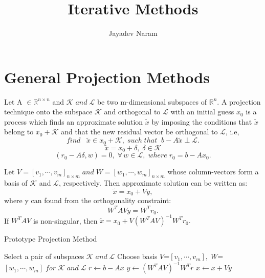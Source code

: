 \documentclass[10pt,a4paper]{article}
\author{Jayadev Naram}
\title{Iterative Methods}
\begin{document}
\maketitle 

\maketitle
 
\tableofcontents

\newpage

  
\newtheorem{theorem}{Theorem}
\newtheorem{corollary}{Corollary}[theorem]
\newtheorem{lemma}[theorem]{Lemma}
\newtheorem{mydef}{Definition}
\newtheorem*{remark}{Remark}
\newtheorem*{prop}{Proposition}

\section{General Projection Methods}

Let A $\in\mathbb{R}^{n\times n}$ and $\mathcal{K}\;and\;\mathcal{L}$ be two m-dimensional subspaces of $\mathbb{R}^n$. A projection technique onto the subspace $\mathcal{K}$ and orthogonal to $\mathcal{L}$ with an initial guess $x_0$ is a process which finds an approximate solution $\tilde{x}$ by imposing the conditions that $\tilde{x}$ belong to $x_0+\mathcal{K}$ and that the new residual vector be orthogonal to $\mathcal{L}$, i.e, $$find\;\;\;\tilde{x}\in x_0+\mathcal{K},\;such\;that\;\;b-A\tilde{x}\perp \mathcal{L}.$$
$$\tilde{x}=x_0+\delta,\;\delta\in\mathcal{K}$$
$$(r_0-A\delta,w)=0,\;\forall\,w\in\mathcal{L},\;where\;r_0=b-Ax_0.$$

Let $V=[v_1,\cdots,v_m]_{n\times m}\;and\;W=[w_1,\cdots,w_m]_{n\times m}$ whose column-vectors form a basis of $\mathcal{K}$ and $\mathcal{L}$, respectively.
Then approximate solution can be written as:
$$\tilde{x}=x_0+Vy,$$
where y can found from the orthogonality constraint:
$$W^TAVy=W^Tr_0.$$
If $W^TAV$ is non-singular, then $\tilde{x}=x_0+V(W^TAV)^{-1}W^Tr_0.$

\begin{algorithm}
\caption{Prototype Projection Method}
\begin{algorithmic}[1]
\Repeat
	\State Select a pair of subspaces $\mathcal{K}\;and\;\mathcal{L}$
	\State Choose basis $V$=$[v_1,\cdots,v_m],\;W$=$[w_1,\cdots,w_m]\;for\;\mathcal{K}\;and\;\mathcal{L}$
	\State $r\gets b-Ax$
	\State $y\gets (W^TAV)^{-1}W^Tr$
	\State $x\gets x+Vy$
\end{algorithmic}
\end{algorithm}
\end{document}
